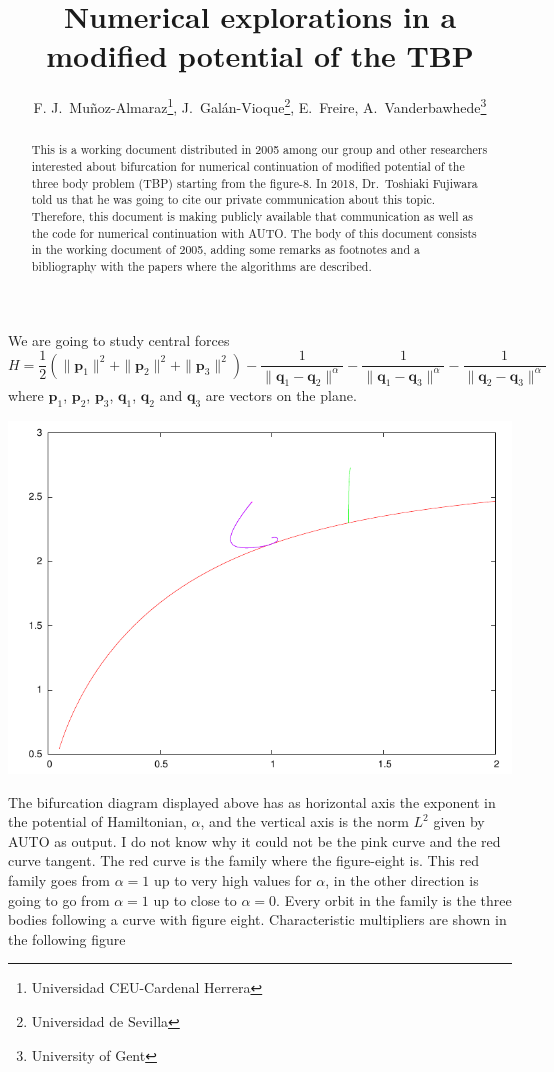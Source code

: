\documentclass{article}
\title{Numerical explorations in a modified potential of the TBP}
\author{F. J.~Mu\~noz-Almaraz\footnote{Universidad CEU-Cardenal
    Herrera}, J.~Gal\'an-Vioque\footnote{Universidad de Sevilla},
  E.~Freire\footnotemark[2]%
  ,
  A.~Vanderbawhede\footnote{University of Gent}}
\begin{document}
\maketitle
\begin{abstract}
  This is a working document distributed in 2005 among our group and other
  researchers interested about bifurcation for numerical continuation
  of modified potential of the three body problem (TBP) starting from
  the figure-8\cite{Ocho}. In 2018, Dr.~Toshiaki Fujiwara told us that he was
  going to cite our private communication about this topic. Therefore,
 this document is making publicly available that communication as well
 as the code for numerical continuation  with AUTO. The body of this
 document consists in the working document of 2005, adding some
 remarks as footnotes and a bibliography with the papers where the
 algorithms are described. 
\end{abstract}
We are going to study central forces 
\begin{equation}
H=\frac 1 2 (\| \mathbf{p}_1\|^2 +\| \mathbf{p}_2\|^2+ \| \mathbf{p}_3\|^2) - \frac 1 {\|  \mathbf{q}_1-\mathbf{q}_2\|^{\alpha}}
-\frac 1 {\|  \mathbf{q}_1-\mathbf{q}_3\|^{\alpha}}-\frac 1 {\|  \mathbf{q}_2-\mathbf{q}_3\|^{\alpha}}
\end{equation}
where $\mathbf{p}_1$, $\mathbf{p}_2$, $\mathbf{p}_3$, $\mathbf{q}_1$, $\mathbf{q}_2$ and  $\mathbf{q}_3$ 
are vectors on the plane.
  
\includegraphics{bd.pdf}

The bifurcation diagram displayed above has as horizontal axis the exponent in the potential of Hamiltonian, $\alpha$, 
and the vertical axis is the norm $L^2$ given by AUTO as output. I do not know why it could not be the pink curve and  the red curve tangent.
The red curve is the family where the figure-eight is. This red family goes from $\alpha=1$ up to very high values for $\alpha$, in the other 
direction is going to go from $\alpha=1$ up to close to $\alpha=0$. Every orbit in the family is the three bodies following a curve with figure eight. 
Characteristic multipliers are shown in the following figure
\end{document}
